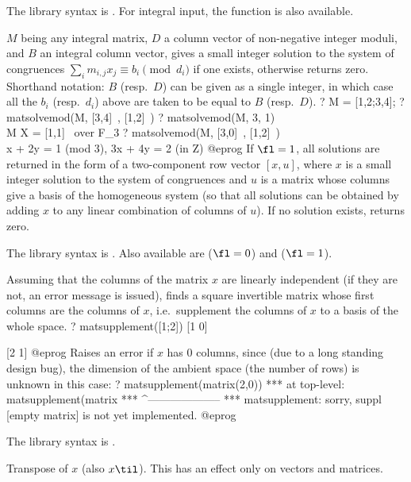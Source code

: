 The library syntax is .
For integral input, the function
 is also available.

\label{se:matsolvemod}
$M$ being any integral matrix,
$D$ a column vector of non-negative integer moduli, and $B$ an integral
column vector, gives a small integer solution to the system of congruences
$\sum_i m_{i,j}x_j\equiv b_i\pmod{d_i}$ if one exists, otherwise returns
zero. Shorthand notation: $B$ (resp.~$D$) can be given as a single integer,
in which case all the $b_i$ (resp.~$d_i$) above are taken to be equal to $B$
(resp.~$D$).
\bprog
? M = [1,2;3,4];
? matsolvemod(M, [3,4]~, [1,2]~)
? matsolvemod(M, 3, 1) \\ M X = [1,1]~ over F_3
? matsolvemod(M, [3,0]~, [1,2]~) \\ x + 2y = 1 (mod 3), 3x + 4y = 2 (in Z)
@eprog
If $\fl=1$, all solutions are returned in the form of a two-component row
vector $[x,u]$, where $x$ is a small integer solution to the system of
congruences and $u$ is a matrix whose columns give a basis of the homogeneous
system (so that all solutions can be obtained by adding $x$ to any linear
combination of columns of $u$). If no solution exists, returns zero.

The library syntax is .
Also available are 
($\fl=0$) and  ($\fl=1$).

\label{se:matsupplement}
Assuming that the columns of the matrix $x$
are linearly independent (if they are not, an error message is issued), finds
a square invertible matrix whose first columns are the columns of $x$,
i.e.~supplement the columns of $x$ to a basis of the whole space.
\bprog
? matsupplement([1;2])
[1 0]

[2 1]
@eprog
Raises an error if $x$ has 0 columns, since (due to a long standing design
bug), the dimension of the ambient space (the number of rows) is unknown in
this case:
\bprog
? matsupplement(matrix(2,0))
  ***   at top-level: matsupplement(matrix
  ***                 ^--------------------
  *** matsupplement: sorry, suppl [empty matrix] is not yet implemented.
@eprog

The library syntax is .

\label{se:mattranspose}
Transpose of $x$ (also $x\til$).
This has an effect only on vectors and matrices.

